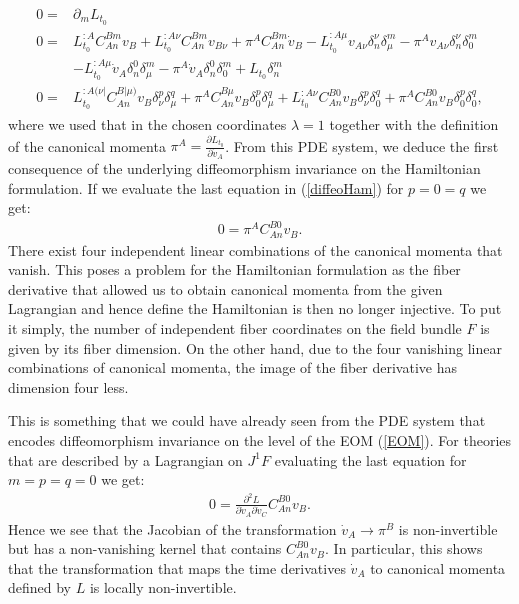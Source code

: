 \begin{align}\label{diffeoHam}
    \begin{aligned}
    0 = &\partial_m L_{t_0} \\
    0 = &L_{t_0}^{:A} C_{An}^{Bm} v_B + L_{t_0}^{:A\nu} C_{An}^{B m} v_{B\nu} + \pi^A C_{An}^{B m}\dot{v}_B - L_{t_0}^{:A \mu} v_{A\nu} \delta^{\nu}_n \delta^m_{\mu}
    - \pi^A v_{A\nu} \delta^{\nu}_n \delta^m_{0} \\
    &- L_{t_0}^{:A \mu} \dot{v}_A \delta^0_n \delta^m_{\mu}
    - \pi^A \dot{v}_A \delta^0_n \delta^m_0 + L_{t_0} \delta_n^m \\
    0 = &L_{t_0}^{:A (\nu \vert } C_{An}^{B \vert \mu)} v_B \delta_{\nu}^{p} \delta_{\mu}^{q}
    +\pi^A C_{An}^{B  \mu} v_B \delta_{0}^{p} \delta_{\mu}^{q}
    +L_{t_0}^{:A \nu } C_{An}^{B 0} v_B \delta_{\nu}^{p} \delta_{0}^{q}
    +\pi^A C_{An}^{B  0} v_B \delta_{0}^{p} \delta_{0}^{q},
    \end{aligned}
\end{align}
where we used that in the chosen coordinates $\lambda = 1$ together with the definition of the canonical momenta $\pi^A = \frac{\partial L_{t_0}}{\partial \dot{v}_A}$. 
From this PDE system, we deduce the first consequence of the underlying diffeomorphism invariance on the Hamiltonian formulation. If we evaluate the last equation in (\ref{diffeoHam}) for $p=0=q$ we get:
\begin{align}\label{ConstrPi}
    0=\pi^A C_{An}^{B0}v_B.
\end{align}
There exist four independent linear combinations of the canonical momenta that vanish. This poses a problem for the Hamiltonian formulation as the fiber derivative that allowed us to obtain canonical momenta from the given Lagrangian and hence define the Hamiltonian is then no longer injective. To put it simply, the number of independent fiber coordinates on the field bundle $F$ is given by its fiber dimension. On the other hand, due to the four vanishing linear combinations of canonical momenta, the image of the fiber derivative has dimension four less.

This is something that we could have already seen from the PDE system that encodes diffeomorphism invariance on the level of the EOM (\ref{EOM}). For theories that are described by a Lagrangian on $J^1F$ evaluating the last equation for $m=p=q=0$ we get: 
\begin{align}\label{Constr1}
    0 = \frac{\partial^2 L}{\partial \dot{v}_A \partial \dot{v}_C } C_{An}^{B0} v_B.
\end{align}
Hence we see that the Jacobian of the transformation $\dot{v}_A \rightarrow \pi^B$ is non-invertible but has a non-vanishing kernel that contains $C_{An}^{B0}v_B$. In particular, this shows that the transformation that maps the time derivatives $\dot{v}_A$ to canonical momenta defined by $L$ is locally non-invertible. 

